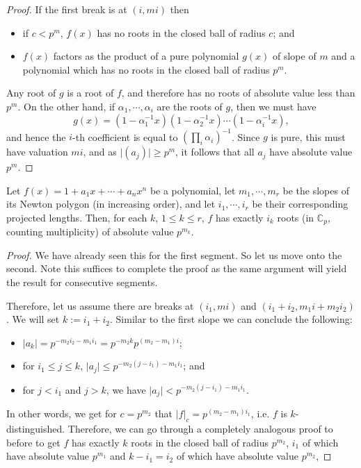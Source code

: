 \begin{proof}
  If the first break is at $(i,mi)$ then
  \begin{itemize}
    \item if $c < p^m$, $f(x)$ has no roots in the closed ball of radius $c$; and
    \item $f(x)$ factors as the product of a pure polynomial $g(x)$ of slope of $m$ and a polynomial
      which has no roots in the closed ball of radius $p^m$.
  \end{itemize}
  Any root of $g$ is a root of $f$, and therefore has no roots of absolute value less than $p^m$. On
  the other hand, if $\alpha_1, \cdots, \alpha_i$ are the roots of $g$, then we must have
  \[
    g(x) = (1 - \alpha_1^{-1}x) (1 - \alpha_2^{-1}x) \cdots (1 - \alpha_i^{-1}x),
  \]
  and hence the $i$-th coefficient is equal to $(\prod_i \alpha_i)^{-1}$. Since $g$ is pure, this
  must have valuation $mi$, and as $\lvert (a_j) \rvert \geq p^m$, it follows that all $a_j$ have
  absolute value $p^m$.
\end{proof}

\begin{theorem}
  Let $f(x) = 1 + a_1 x + \cdots + a_n x^n$ be a polynomial, let $m_1, \cdots, m_r$ be the slopes
  of its Newton polygon (in increasing order), and let $i_1, \cdots, i_r$ be their corresponding
  projected lengths. Then, for each $k$, $1 \leq k \leq r$, $f$ has exactly $i_k$ roots
  (in $\mathbb{C}_p$, counting multiplicity) of absolute value $p^{m_k}$.
\end{theorem}

\begin{proof}
  We have already seen this for the first segment. So let us move onto the second. Note this suffices
  to complete the proof as the same argument will yield the result for consecutive segments.

  Therefore, let us assume there are breaks at $(i_1,mi)$ and $(i_1 + i_2, m_1 i + m_2 i_2)$. We
  will set $k := i_1 + i_2$. Similar to the first slope we can conclude the following:
  \begin{itemize}
    \item $\lvert a_k \rvert = p^{-m_2 i_2 - m_1 i_1} = p^{-m_2 k} p^{(m_2 - m_1)i}$;
    \item for $i_1 \leq j \leq k$, $\lvert a_j \rvert \leq p^{-m_2 (j - i_1) - m_1 i_1}$; and
    \item for $j < i_1$ and $ j > k$, we have $\lvert a_j \rvert < p^{-m_2 (j - i_1)- m_1 i_1}.$
  \end{itemize}
  In other words, we get for $c = p^{m_2}$ that $\lvert f \rvert_c = p^{(m_2 - m_1)i_1}$, i.e. $f$
  is $k$-distinguished. Therefore, we can go through a completely analogous proof to before to get
  $f$ has exactly $k$ roots in the closed ball of radius $p^{m_2}$, $i_1$ of which have absolute
  value $p^{m_1}$ and $k-i_1 = i_2$ of which have absolute value $p^{m_2}$,
\end{proof}

